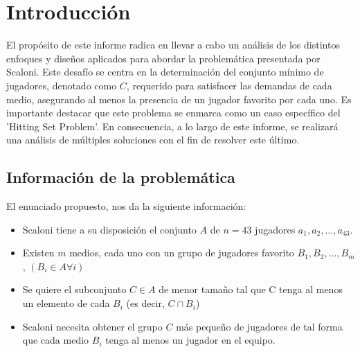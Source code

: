 \section{Introducción}

El propósito de este informe radica en llevar a cabo un análisis de los 
distintos enfoques y diseños aplicados para abordar la problemática presentada por 
Scaloni. Este desafío se centra en la determinación del conjunto mínimo de jugadores,
denotado como $C$, requerido para satisfacer las demandas de cada medio, asegurando al 
menos la presencia de un jugador favorito por cada uno. Es importante destacar que este 
problema se enmarca como un caso específico del 'Hitting Set Problem'. 
En consecuencia, a lo largo de este informe, se realizará una análisis de múltiples soluciones con el fin de resolver este último. 

\subsection{Información de la problemática}

El enunciado propuesto, nos da la siguiente información:

\begin{itemize}

    \item Scaloni tiene a su disposición el conjunto $A$ de $n=43$ jugadores $a_1, a_2, \dots, a_{43}$.
    \item Existen $m$ medios, cada uno con un grupo de jugadores favorito $B_1, B_2, \dots, B_m$, 
    $(B_i \in A \forall i)$
    \item Se quiere el subconjunto $C \in A$ de menor tamaño tal que C tenga al menos un elemento de cada $B_i$ (es decir, $C \cap B_i$) 
    \item Scaloni necesita obtener el grupo $C$ más pequeño de jugadores de tal forma que cada medio $B_i$ tenga al menos un jugador en el equipo.

\end{itemize}
